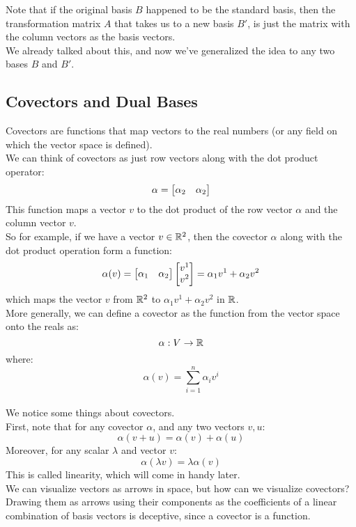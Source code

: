 \documentclass[12pt]{article}
\begin{document}
Note that if the original basis $B$ happened
to be the standard basis, then the
transformation matrix $A$
that takes us to a new basis $B'$,
is just the matrix with the column vectors
as the basis vectors. \\
We already talked about this,
and now we've generalized the idea
to any two bases $B$ and $B'$. \\

\newpage

\subsection*{Covectors and Dual Bases}

Covectors are functions
that map vectors to the real numbers
(or any field on which the vector space
is defined). \\

We can think of covectors as just row vectors
along with the dot product operator:
\[ \alpha = \begin{bmatrix} {\alpha_2}&{\alpha_2} \end{bmatrix} \]
This function maps a vector $v$
to the dot product of the row vector $\alpha$
and the column vector $v$. \\

So for example, if we have a vector $v \in \mathbb{R}^2$,
then the covector $\alpha$ along with the dot product
operation form a function:
\[ \alpha(v) =
\begin{bmatrix} {\alpha_1}&{\alpha_2} \end{bmatrix}
\begin{bmatrix} {v^1}\\{v^2} \end{bmatrix} = \alpha_1v^1 + \alpha_2v^2 \]
which maps the vector $v$ from $\mathbb{R}^2$
to $\alpha_1v^1 + \alpha_2v^2$ in $\mathbb{R}$. \\

More generally, we can define a covector
as the function from the vector space
onto the reals as:
\[ \alpha: V \to \mathbb{R} \]
where:
\[ \alpha(v) = \sum_{i = 1}^{n} \alpha_iv^i \] \\

We notice some things about covectors. \\
First, note that for any covector $\alpha$,
and any two vectors $v, u$:
\[ \alpha(v + u) = \alpha(v) + \alpha(u) \]
Moreover, for any scalar $\lambda$
and vector $v$:
\[ \alpha(\lambda v) = \lambda \alpha(v) \]
This is called linearity,
which will come in handy later. \\

We can visualize vectors as arrows in space,
but how can we visualize covectors?
Drawing them as arrows using their components
as the coefficients of a linear combination
of basis vectors is deceptive,
since a covector is a function. \\
\end{document}
